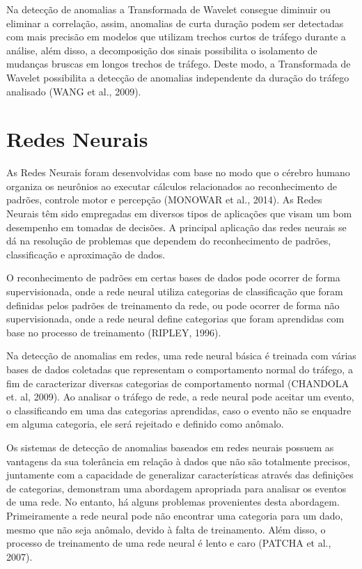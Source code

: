 \documentclass[12pt,openright,oneside,a4paper,english,spanish,brazil]{unifil}
\begin{document}
\indent Na detecção de anomalias a Transformada de Wavelet consegue diminuir ou eliminar a correlação, assim, anomalias de curta duração podem ser detectadas com mais precisão em modelos que utilizam trechos curtos de tráfego durante a análise, além disso, a decomposição dos sinais possibilita o isolamento de mudanças bruscas em longos trechos de tráfego. Deste modo, a Transformada de Wavelet possibilita a detecção de anomalias independente da duração do tráfego analisado (WANG et al., 2009).
    
  \section{Redes Neurais}
\indent As Redes Neurais foram desenvolvidas com base no modo que o cérebro humano organiza os neurônios ao executar cálculos relacionados ao reconhecimento de padrões, controle motor e percepção (MONOWAR et al., 2014). As Redes Neurais têm sido empregadas em diversos tipos de aplicações que visam um bom desempenho em tomadas de decisões. A principal aplicação das redes neurais se dá na resolução de problemas que dependem do reconhecimento de padrões, classificação e aproximação de dados. 

\indent O reconhecimento de padrões em certas bases de dados pode ocorrer de forma supervisionada, onde a rede neural utiliza categorias de classificação que foram definidas pelos padrões de treinamento da rede, ou pode ocorrer de forma não supervisionada, onde a rede neural define categorias que foram aprendidas com base no processo de treinamento (RIPLEY, 1996).

\indent Na detecção de anomalias em redes, uma rede neural básica é treinada com várias bases de dados coletadas que representam o comportamento normal do tráfego, a fim de caracterizar diversas categorias de comportamento normal (CHANDOLA et. al, 2009). Ao analisar o tráfego de rede, a rede neural pode aceitar um evento, o classificando em uma das categorias aprendidas, caso o evento não se enquadre em alguma categoria, ele será rejeitado e definido como anômalo.

\indent Os sistemas de detecção de anomalias baseados em redes neurais possuem as  vantagens da sua tolerância em relação à dados que não são totalmente precisos, juntamente com a capacidade de generalizar características através das definições de categorias, demonstram uma abordagem apropriada para analisar os eventos de uma rede. No entanto, há alguns problemas provenientes desta abordagem. Primeiramente a rede neural pode não encontrar uma categoria para um dado, mesmo que não seja anômalo, devido à falta de treinamento. Além disso, o processo de treinamento de uma rede neural é lento e caro (PATCHA et al., 2007).
\end{document}
